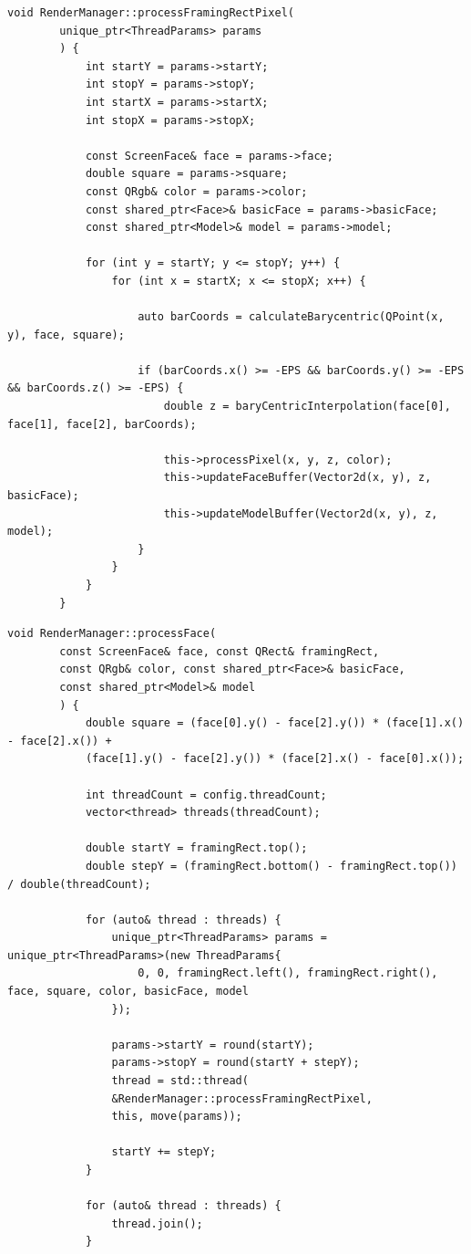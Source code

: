 \begin{center}
	\captionsetup{justification=raggedright,singlelinecheck=off}
	\begin{lstlisting}[label=lst:process_rect,caption=Реализация алгоритма обработки пикселей обрамляющего прямоугольника]
		void RenderManager::processFramingRectPixel(
		unique_ptr<ThreadParams> params
		) {
			int startY = params->startY;
			int stopY = params->stopY;
			int startX = params->startX;
			int stopX = params->stopX;
			
			const ScreenFace& face = params->face;
			double square = params->square;
			const QRgb& color = params->color;
			const shared_ptr<Face>& basicFace = params->basicFace;
			const shared_ptr<Model>& model = params->model;
			
			for (int y = startY; y <= stopY; y++) {
				for (int x = startX; x <= stopX; x++) {
					
					auto barCoords = calculateBarycentric(QPoint(x, y), face, square);
					
					if (barCoords.x() >= -EPS && barCoords.y() >= -EPS && barCoords.z() >= -EPS) {
						double z = baryCentricInterpolation(face[0], face[1], face[2], barCoords);
						
						this->processPixel(x, y, z, color);
						this->updateFaceBuffer(Vector2d(x, y), z, basicFace);
						this->updateModelBuffer(Vector2d(x, y), z, model);
					}
				}
			}
		}
	\end{lstlisting}
\end{center}

\clearpage

\begin{center}
	\captionsetup{justification=raggedright,singlelinecheck=off}
	\begin{lstlisting}[label=lst:process_face,caption=Реализация алгоритма обработки грани в несколько потоков]
		void RenderManager::processFace(
		const ScreenFace& face, const QRect& framingRect, 
		const QRgb& color, const shared_ptr<Face>& basicFace, 
		const shared_ptr<Model>& model
		) {
			double square = (face[0].y() - face[2].y()) * (face[1].x() - face[2].x()) +
			(face[1].y() - face[2].y()) * (face[2].x() - face[0].x());
			
			int threadCount = config.threadCount;
			vector<thread> threads(threadCount);
			
			double startY = framingRect.top();
			double stepY = (framingRect.bottom() - framingRect.top()) / double(threadCount);
			
			for (auto& thread : threads) {
				unique_ptr<ThreadParams> params = unique_ptr<ThreadParams>(new ThreadParams{
					0, 0, framingRect.left(), framingRect.right(), face, square, color, basicFace, model
				});
				
				params->startY = round(startY);
				params->stopY = round(startY + stepY);
				thread = std::thread(
				&RenderManager::processFramingRectPixel, 
				this, move(params));
				
				startY += stepY;
			}
			
			for (auto& thread : threads) {
				thread.join();
			}
			
		\end{lstlisting}
	\end{center}

